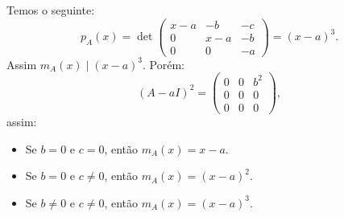 \documentclass[11pt,a4paper]{article}
\begin{document}
{{\[\]
Temos o seguinte:
\[
p_A(x)=\det\begin{pmatrix}
x-a & -b & -c \\ 0 & x-a & -b \\ 0 & 0 & -a
\end{pmatrix}=(x-a)^3.
\]
Assim $m_A(x)\mid(x-a)^3$. Porém:
\[
(A-aI)^2=\begin{pmatrix}
0 & 0 & b^2 \\ 0 & 0 & 0 \\ 0 & 0 & 0
\end{pmatrix},
\]
assim:
\begin{itemize}
\item Se $b=0$ e $c=0$, então $m_A(x)=x-a$.
\item Se $b=0$ e $c\neq 0$, então $m_A(x)=(x-a)^2$.
\item Se $b\neq 0$ e $c\neq 0$, então $m_A(x)=(x-a)^3$.
\end{itemize}
}
}
\end{document}
